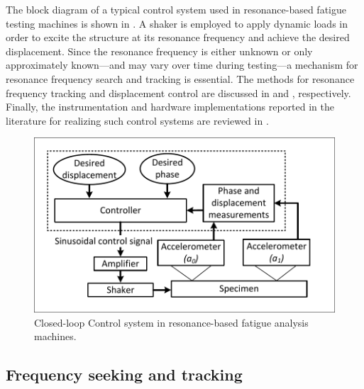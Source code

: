 \documentclass[lettersize,journal]{IEEEtran}
\begin{document}
The block diagram of a typical control system used in resonance-based fatigue testing machines is shown in . A shaker is employed to apply dynamic loads in order to excite the structure at its resonance frequency and achieve the desired displacement. Since the resonance frequency is either unknown or only approximately known—and may vary over time during testing—a mechanism for resonance frequency search and tracking is essential. The methods for resonance frequency tracking and displacement control are discussed in  and , respectively. Finally, the instrumentation and hardware implementations reported in the literature for realizing such control systems are reviewed in .
\begin{figure}
    \centering    \includegraphics[width=\linewidth]{Control_system_fatigue_total.pdf}
    \caption{Closed-loop Control system in resonance-based fatigue analysis machines.}
    \label{F_control_diagram}
\end{figure}



\subsection{Frequency seeking and tracking}  \label{S_frequency_seeking}
\end{document}

